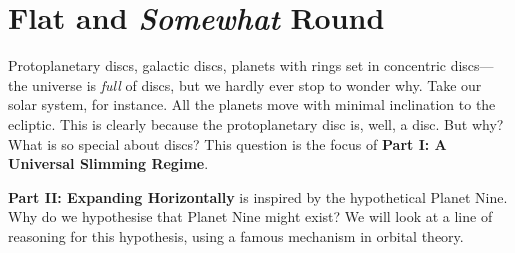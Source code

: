 \documentclass[a4paper,11pt]{exam}
\begin{document}
\section{Flat and \textit{Somewhat} Round}
Protoplanetary discs, galactic discs, planets with rings set in concentric discs---the universe is \textit{full} of discs, but we hardly ever stop to wonder why. Take our solar system, for instance. All the planets move with minimal inclination to the ecliptic. This is clearly because the protoplanetary disc is, well, a disc. But why? What is so special about discs? This question is the focus of \textbf{Part I: A Universal Slimming Regime}.

\textbf{Part II: Expanding Horizontally} is inspired by the hypothetical Planet Nine. Why do we hypothesise that Planet Nine might exist? We will look at a line of reasoning for this hypothesis, using a famous mechanism in orbital theory.
\end{document}
